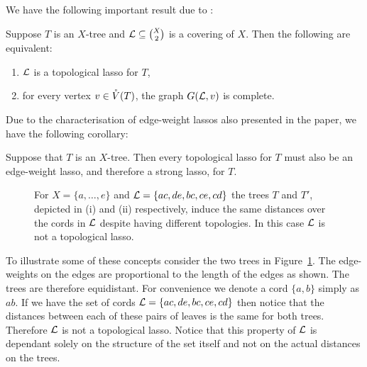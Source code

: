 We have the following important result due to \cite{HP13}:
\begin{lem}
  \label{lem:child-edge-graph-complete}
  Suppose $T$ is an $X$-tree and ${\mathcal L} \subseteq {X \choose 2}$ is a covering
  of $X$.  Then the following are equivalent:
  \begin{enumerate}
  \item ${\mathcal L}$ is a topological lasso for $T$,
  \item for every vertex $v \in \mathring{V}(T)$, the graph $G({\mathcal L},v)$ is complete.
  \end{enumerate}
\end{lem}

Due to the characterisation of edge-weight lassos also presented in the paper,
we have the following corollary:
\begin{cor}
  \label{cor:topo-is-edge-weight}
  Suppose that $T$ is an $X$-tree.  Then every topological lasso for $T$ must
  also be an edge-weight lasso, and therefore a strong lasso, for $T$.
\end{cor}

\begin{figure}
\begin{center}

\end{center}
\caption{For $X = \{a,\dotsc,e\}$ and ${\mathcal L}=\{ac,de,bc,ce,cd\}$ the trees $T$
  and $T'$, depicted in (i) and (ii) respectively, induce the same distances
  over the cords in ${\mathcal L}$ despite having different topologies.  In this case
  ${\mathcal L}$ is not a topological lasso.}
\label{fig:lasso-example}
\end{figure}

To illustrate some of these concepts consider the two trees in
Figure~\ref{fig:lasso-example}.  The edge-weights on the edges are
proportional to the length of the edges as shown.  The trees are therefore
equidistant.  For convenience we denote a cord $\{a,b\}$ simply as $ab$.  If
we have the set of cords ${\mathcal L}=\{ac,de,bc,ce,cd\}$ then notice that the
distances between each of these pairs of leaves is the same for both trees.
Therefore ${\mathcal L}$ is not a topological lasso.  Notice that this property of
${\mathcal L}$ is dependant solely on the structure of the set itself and not on the
actual distances on the trees.

